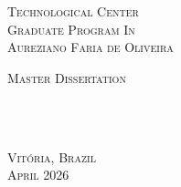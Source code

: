 \documentclass[
12pt, %
oneside, %
english, %
onehalfspacing,%
liststotoc, %
parskip, %
headsepline, %
]{MastersDoctoralThesis} %
\author{Aureziano Faria de Oliveira}
\begin{document}
\sloppy

\pagestyle{empty}

\begin{titlepage}
\begin{center}

{\scshape\LARGE \univname\par}\vspace{0.2cm} %
\textsc{\large Technological Center}\\[0.4cm] %
\textsc{\large Graduate Program In }\\ [4cm] %


\textsc{\large Aureziano Faria de Oliveira} \\


\vspace*{\fill}

\textsc{\large Master Dissertation} \\ [0.4cm]

\HRule \\[0.2cm] %
{\LARGE \bfseries \ttitle\par}\vspace{0.4cm} %
\HRule \\[1cm] %
 
\vspace*{\fill}



\textsc{\large Vit\'{o}ria, Brazil} \\
\textsc{\large April 2026} 

 
\end{center}
\end{titlepage}


\end{document}
